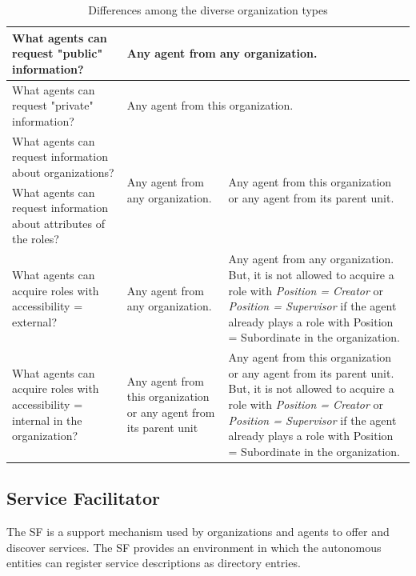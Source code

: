 \begin{table}
\begin{center}
\begin{tabular}{|p{3cm}|p{3cm}|p{3cm}|p{5.5cm}|}
What agents can request "public" information? & \multicolumn{3}{|p{11.5cm}|}{Any agent from any organization.}\\ \hline
What agents can request "private" information? & \multicolumn{3}{|p{11.5cm}|}{Any agent from this organization.}\\ \hline
What agents can request information about organizations? & \multirow{2}{3cm}{Any agent from any organization.} & \multicolumn{2}{|p{6cm}|}{\multirow{2}{*}{Any agent from this organization  or any agent from its parent unit.}} \\ \cline{1-1}
What agents can request information about attributes of the roles? & & \multicolumn{2}{|p{6cm}|}{\multirow{2}{*}{}}  \\ \hline
What agents  can acquire roles with accessibility = external?& \multicolumn{2}{|p{6cm}|}{Any agent from any organization.}  & Any agent from any organization. But, it is not allowed to acquire a role with \textit{Position = Creator} or \textit{Position = Supervisor} if the agent already plays a role with Position = Subordinate in the organization.\\ \hline
What agents  can acquire roles with accessibility = internal in the organization? & \multicolumn{2}{|p{6cm}|}{Any agent from this organization  or any agent from its parent unit}  & Any agent from this organization  or any agent from its parent unit.  But, it is not allowed to acquire a role with \textit{Position = Creator} or \textit{Position = Supervisor} if the agent already plays a role with Position = Subordinate in the organization. \\ \hline
\end{tabular}
\caption{Differences among the diverse organization types}
\label{tab:units}
\end{center}
\end{table}
\clearemptydoublepage
\subsection{Service Facilitator}
The SF is a support mechanism  used by organizations and agents to offer and discover services. The SF provides an environment in which the autonomous entities can register service descriptions as directory entries.


